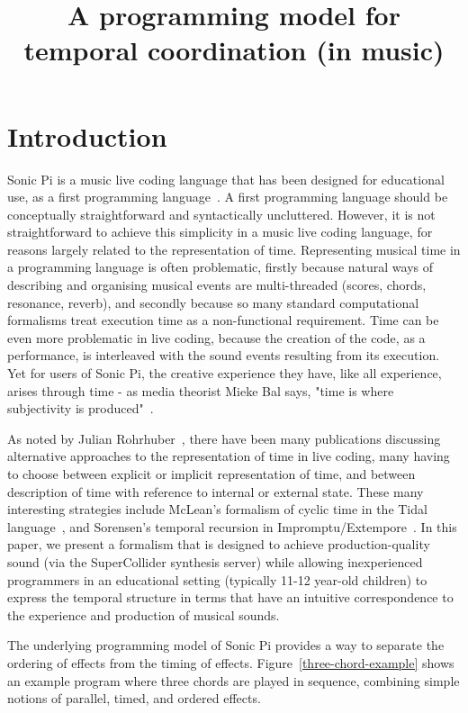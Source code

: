 \documentclass[preprint]{sigplanconf}
\title{A programming model for temporal coordination (in music)}
\newcommand{\note}[1]{{\color{blue}{#1}}}
\theoremstyle{definition}
\begin{document}
\maketitle

\section{Introduction}
\label{sec:introduction}

\note{Introduction to Sonic Pi}

Sonic Pi is a music live coding language that has been designed for
educational use, as a first programming language~\cite{Aaron2013}. A first
programming language should be conceptually straightforward and
syntactically uncluttered. However, it is not straightforward to achieve
this simplicity in a music live coding language, for reasons largely
related to the representation of time. Representing musical time in a
programming language is often problematic, firstly because natural ways
of describing and organising musical events are multi-threaded (scores,
chords, resonance, reverb), and secondly because so many standard
computational formalisms treat execution time as a non-functional
requirement. Time can be even more problematic in live coding, because
the creation of the code, as a performance, is interleaved with the
sound events resulting from its execution. Yet for users of Sonic Pi,
the creative experience they have, like all experience, arises through
time - as media theorist Mieke Bal says, "time is where subjectivity is
produced"~\cite{Bal2002}.

As noted by Julian Rohrhuber~\cite{blackwell_et_al2014}, there have been
many publications discussing alternative approaches to the
representation of time in live coding, many having to choose between
explicit or implicit representation of time, and between description of
time with reference to internal or external state. These many
interesting strategies include McLean's formalism of cyclic time in the
Tidal language~\cite{McLean2013}, and Sorensen's temporal recursion in
Impromptu/Extempore~\cite{Sorensen2010}. In this paper, we present a formalism that is
designed to achieve production-quality sound (via the SuperCollider
synthesis server) while allowing inexperienced programmers in an
educational setting (typically 11-12 year-old children) to express the
temporal structure in terms that have an intuitive correspondence to the
experience and production of musical sounds.

The underlying programming model of Sonic Pi provides a way to separate
the ordering of effects from the timing of
effects. Figure~\ref{three-chord-example} shows an example program
where three chords are played in sequence, combining simple notions of
parallel, timed, and ordered effects.
\end{document}
